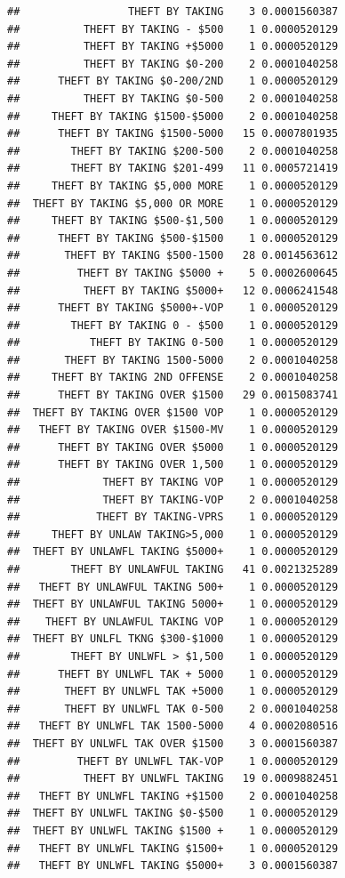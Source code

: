 \documentclass[]{book}
\begin{document}
\begin{verbatim}
##                 THEFT BY TAKING    3 0.0001560387
##          THEFT BY TAKING - $500    1 0.0000520129
##          THEFT BY TAKING +$5000    1 0.0000520129
##          THEFT BY TAKING $0-200    2 0.0001040258
##      THEFT BY TAKING $0-200/2ND    1 0.0000520129
##          THEFT BY TAKING $0-500    2 0.0001040258
##     THEFT BY TAKING $1500-$5000    2 0.0001040258
##      THEFT BY TAKING $1500-5000   15 0.0007801935
##        THEFT BY TAKING $200-500    2 0.0001040258
##        THEFT BY TAKING $201-499   11 0.0005721419
##     THEFT BY TAKING $5,000 MORE    1 0.0000520129
##  THEFT BY TAKING $5,000 OR MORE    1 0.0000520129
##     THEFT BY TAKING $500-$1,500    1 0.0000520129
##      THEFT BY TAKING $500-$1500    1 0.0000520129
##       THEFT BY TAKING $500-1500   28 0.0014563612
##         THEFT BY TAKING $5000 +    5 0.0002600645
##          THEFT BY TAKING $5000+   12 0.0006241548
##      THEFT BY TAKING $5000+-VOP    1 0.0000520129
##        THEFT BY TAKING 0 - $500    1 0.0000520129
##           THEFT BY TAKING 0-500    1 0.0000520129
##       THEFT BY TAKING 1500-5000    2 0.0001040258
##     THEFT BY TAKING 2ND OFFENSE    2 0.0001040258
##      THEFT BY TAKING OVER $1500   29 0.0015083741
##  THEFT BY TAKING OVER $1500 VOP    1 0.0000520129
##   THEFT BY TAKING OVER $1500-MV    1 0.0000520129
##      THEFT BY TAKING OVER $5000    1 0.0000520129
##      THEFT BY TAKING OVER 1,500    1 0.0000520129
##             THEFT BY TAKING VOP    1 0.0000520129
##             THEFT BY TAKING-VOP    2 0.0001040258
##            THEFT BY TAKING-VPRS    1 0.0000520129
##     THEFT BY UNLAW TAKING>5,000    1 0.0000520129
##  THEFT BY UNLAWFL TAKING $5000+    1 0.0000520129
##        THEFT BY UNLAWFUL TAKING   41 0.0021325289
##   THEFT BY UNLAWFUL TAKING 500+    1 0.0000520129
##  THEFT BY UNLAWFUL TAKING 5000+    1 0.0000520129
##    THEFT BY UNLAWFUL TAKING VOP    1 0.0000520129
##  THEFT BY UNLFL TKNG $300-$1000    1 0.0000520129
##        THEFT BY UNLWFL > $1,500    1 0.0000520129
##      THEFT BY UNLWFL TAK + 5000    1 0.0000520129
##       THEFT BY UNLWFL TAK +5000    1 0.0000520129
##       THEFT BY UNLWFL TAK 0-500    2 0.0001040258
##   THEFT BY UNLWFL TAK 1500-5000    4 0.0002080516
##  THEFT BY UNLWFL TAK OVER $1500    3 0.0001560387
##         THEFT BY UNLWFL TAK-VOP    1 0.0000520129
##          THEFT BY UNLWFL TAKING   19 0.0009882451
##   THEFT BY UNLWFL TAKING +$1500    2 0.0001040258
##  THEFT BY UNLWFL TAKING $0-$500    1 0.0000520129
##  THEFT BY UNLWFL TAKING $1500 +    1 0.0000520129
##   THEFT BY UNLWFL TAKING $1500+    1 0.0000520129
##   THEFT BY UNLWFL TAKING $5000+    3 0.0001560387

\end{verbatim}
\end{document}
